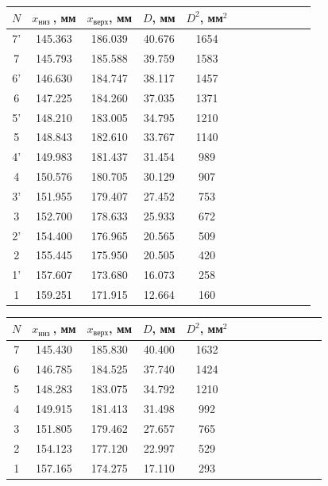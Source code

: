 \documentclass[14pt]{article}
\begin{document}
\begin{center}
\begin{tabular}{|c|c|c|c|c|c|c|c|c|c|c|c|}
\hline
$N$	&	$x_\text{низ }$, мм		&	$x_\text{верх}$, мм		&	$D$, мм		&	$D^2$, мм$^2$	\\
\hline
7'	&	145.363					&	186.039					&	40.676		&	1654			\\
\hline
7	&	145.793					&	185.588					&	39.759		&	1583			\\
\hline
6'	&	146.630					&	184.747					&	38.117		&	1457			\\
\hline
6	&	147.225					&	184.260					&	37.035		&	1371			\\
\hline
5'	&	148.210					&	183.005					&	34.795		&	1210			\\
\hline
5	&	148.843					&	182.610					&	33.767		&	1140			\\
\hline
4'	&	149.983					&	181.437					&	31.454		&	989 			\\
\hline
4	&	150.576					&	180.705					&	30.129		&	907 			\\
\hline
3'	&	151.955					&	179.407					&	27.452		&	753 			\\
\hline
3	&	152.700					&	178.633					&	25.933		&	672 			\\
\hline
2'	&	154.400					&	176.965					&	20.565		&	509				\\
\hline
2	&	155.445					&	175.950					&	20.505		&	420 			\\
\hline
1'	&	157.607					&	173.680					&	16.073		&	258 			\\
\hline
1	&	159.251					&	171.915					&	12.664		&	160 			\\
\hline
\end{tabular}
\end{center}

\begin{center}
\begin{tabular}{|c|c|c|c|c|c|c|c|c|c|c|c|c|}
\hline
$N$	&	$x_\text{низ }$, мм		&	$x_\text{верх}$, мм		&	$D$, мм		&	$D^2$, мм$^2$	\\
\hline
7	&	145.430					&	185.830					&	40.400		&	1632 			\\
\hline
6	&	146.785					&	184.525					&	37.740		&	1424 			\\
\hline
5	&	148.283					&	183.075					&	34.792		&	1210 			\\
\hline
4	&	149.915					&	181.413					&	31.498		&	992 			\\
\hline
3	&	151.805					&	179.462					&	27.657		&	765 			\\
\hline
2	&	154.123					&	177.120					&	22.997		&	529 			\\
\hline
1	&	157.165					&	174.275					&	17.110		&	293 			\\
\hline
\end{tabular}
\end{center}
\end{document}
